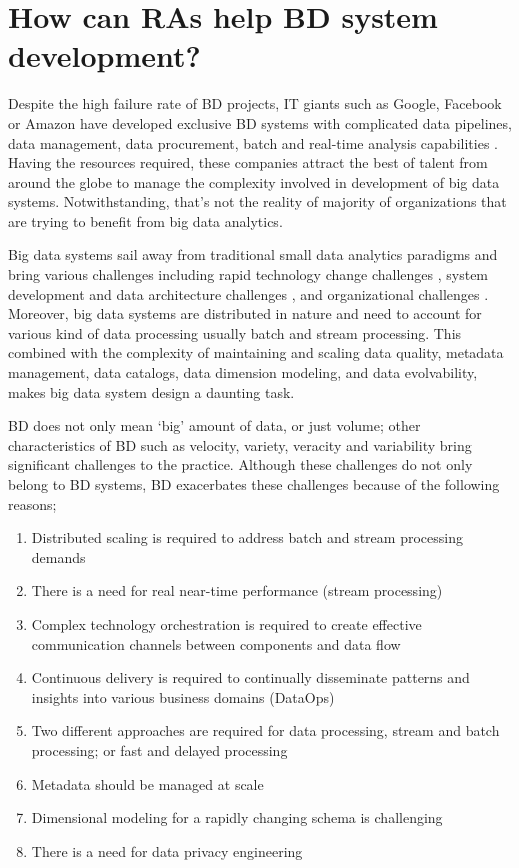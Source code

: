 \documentclass{ieeeaccess}
\begin{document}
\section{How can RAs help BD system development? }

Despite the high failure rate of BD projects, IT giants such as Google, Facebook or Amazon have developed exclusive BD systems with complicated data pipelines, data management, data procurement, batch and real-time analysis capabilities \cite{kohler2019towards}. Having the resources required, these companies attract the best of talent from around the globe to manage the complexity involved in development of big data systems. Notwithstanding, that’s not the reality of majority of organizations that are trying to benefit from big data analytics. 

Big data systems sail away from traditional small data analytics paradigms and bring various challenges including rapid technology change challenges \cite{chen2017big}, system development and data architecture challenges \cite{jagadish2014big}, and organizational challenges \cite{AtaeiHype}. Moreover, big data systems are distributed in nature and need to account for various kind of data processing usually batch and stream processing. This combined with the complexity of maintaining and scaling data quality, metadata management, data catalogs, data dimension modeling, and data evolvability, makes big data system design a daunting task. 

BD does not only mean ‘big’ amount of data, or just volume; other characteristics of BD such as velocity, variety, veracity and variability bring significant challenges to the practice. Although these challenges do not only belong to BD systems, BD exacerbates these challenges because of the following reasons;

\begin{enumerate}
    \item Distributed scaling is required to address batch and stream processing demands
    \item There is a need for real near-time performance (stream processing) 
    \item Complex technology orchestration is required to create effective communication channels between components and data flow
    \item Continuous delivery is required to continually disseminate patterns and insights into various business domains (DataOps)
    \item Two different approaches are required for data processing, stream and batch processing; or fast and delayed processing 
    \item Metadata should be managed at scale 
    \item Dimensional modeling for a rapidly changing schema is challenging 
    \item There is a need for data privacy engineering
\end{enumerate}
\end{document}
